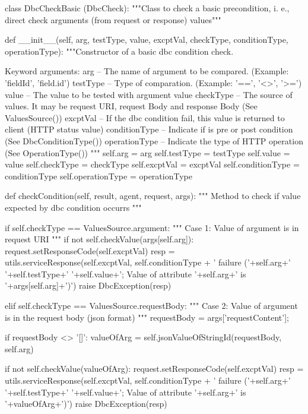         
class DbcCheckBasic (DbcCheck):
    """Class to check a basic precondition, i. e., direct check arguments (from request or response) values"""
    
    def __init__(self, arg,  testType, value, excptVal, checkType, conditionType, operationType):
        """Constructor of a basic dbc condition check.
    
        Keyword arguments:
        arg -- The name of argument to be compared. (Example: 'fieldId', 'field.id')
        testType -- Type of comparation. (Example: '==', '<>', '>=')
        value -- The value to be tested with argument value
        checkType -- The source of values. It may be request URI, request Body and response Body (See ValuesSource())
        excptVal -- If the dbc condition fail, this value is returned to client (HTTP status value)
        conditionType -- Indicate if is pre or post condition (See DbcConditionType())
        operationType -- Indicate the type of HTTP operation (See OperationType())
        """
        self.arg = arg
        self.testType = testType
        self.value = value
        self.checkType = checkType
        self.excptVal = excptVal    
        self.conditionType = conditionType
        self.operationType = operationType    


    def checkCondition(self, result, agent, request, args):
        """ Method to check if value expected by dbc condition occurrs """
        
        if self.checkType == ValuesSource.argument:
            """ Case 1: Value of argument is in request URI """
            if not self.checkValue(args[self.arg]):
                request.setResponseCode(self.excptVal)
                resp = utils.serviceResponse(self.excptVal, self.conditionType + ' failure ('+self.arg+' '+self.testType+' '+self.value+'; Value of attribute '+self.arg+' is '+args[self.arg]+')')
                raise DbcException(resp)
        
        
        elif self.checkType == ValuesSource.requestBody:
            """ Case 2: Value of argument is in the request body (json format) """
            requestBody = args['requestContent'];
            
            if requestBody <> '[]':
                valueOfArg = self.jsonValueOfStringId(requestBody, self.arg)
                
                if not self.checkValue(valueOfArg):
                    request.setResponseCode(self.excptVal)
                    resp = utils.serviceResponse(self.excptVal, self.conditionType + ' failure ('+self.arg+' '+self.testType+' '+self.value+'; Value of attribute '+self.arg+' is '+valueOfArg+')')
                    raise DbcException(resp)
                        
